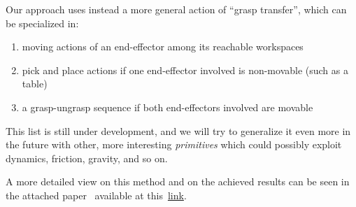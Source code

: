 Our approach uses instead a more general action of ``grasp transfer'', which can be specialized in:
\begin{enumerate}
	\item moving actions of an end-effector among its reachable workspaces
	\item pick and place actions if one end-effector involved is non-movable (such as a table)
	\item a grasp-ungrasp sequence if both end-effectors involved are movable
\end{enumerate}
This list is still under development, and we will try to generalize it even more in the future with other, more interesting \emph{primitives} which could possibly exploit dynamics, friction, gravity, and so on.

A more detailed view on this method and on the achieved results can be seen in the attached paper~\cite{marino2015highlevel} available at this~\href{./attachedPapers/HighLevelPlanningBimanualObjectPassing.pdf}{link}.
